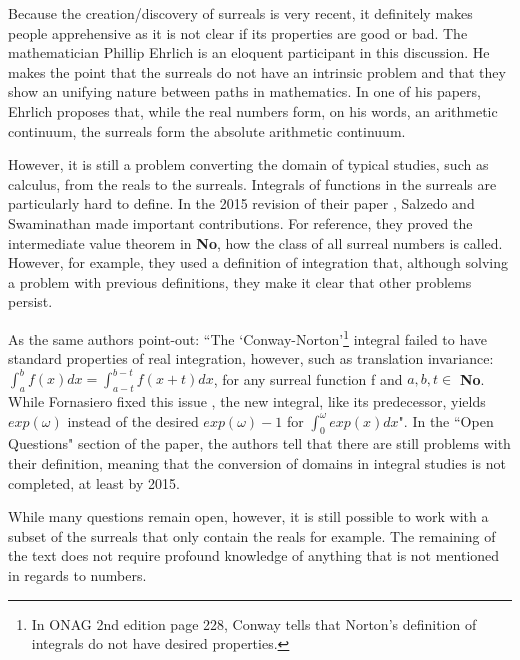 Because the creation/discovery of surreals is very recent, it definitely makes people apprehensive as it is not clear if its properties are good or bad. The mathematician Phillip Ehrlich is an eloquent participant in this discussion. He makes the point that the surreals do not have an intrinsic problem and that they show an unifying nature between paths in mathematics. In one of his papers, Ehrlich proposes that, while the real numbers form, on his words, an arithmetic continuum, the surreals form the absolute arithmetic continuum\cite{7}.

However, it is still a problem converting the domain of typical studies, such as calculus, from the reals to the surreals. Integrals of functions in the surreals are particularly hard to define. In the 2015 revision of their paper \cite{8}, Salzedo and Swaminathan made important contributions. For reference, they proved the intermediate value theorem in \textbf{No}, how the class of all surreal numbers is called. However, for example, they used a definition of integration that, although solving a problem with previous definitions, they make it clear that other problems persist.

As the same authors point-out: ``The `Conway-Norton'\footnote{In ONAG 2nd edition page 228, Conway  tells that Norton's definition of integrals do not have desired properties.}
integral failed to have standard properties of real integration, however, such as translation
invariance: $\int_a^bf(x)dx = \int_{a-t}^{b-t}f(x+t)dx$, for any surreal function f and $a,b,t\in$ \textbf{No}. While Fornasiero fixed this issue \cite{9}, the new integral, like its predecessor, yields
$exp(\omega)$ instead of the desired $exp(\omega)-1$ for $\int_0^{\omega}exp(x)dx$". In the ``Open Questions" section of  the paper, the authors tell that there are still problems with their definition, meaning that the conversion of domains in integral studies is not completed, at least by 2015.

While many questions remain open, however, it is still possible to work with a subset of the surreals that only contain the reals for example. The remaining of the text does not require profound knowledge of anything that is not mentioned in regards to numbers.









